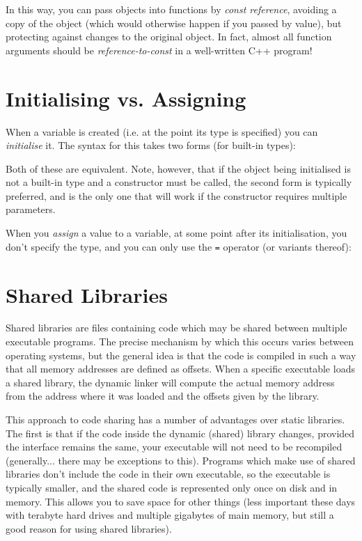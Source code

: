 \documentclass[a4paper]{scrartcl}
\begin{document}
In this way, you can pass objects into functions by \emph{const reference}, avoiding a copy of the object (which would otherwise happen if you passed by value), but protecting against changes to the original object. In fact, almost all function arguments should be \emph{reference-to-const} in a well-written C++ program!

\section{Initialising vs. Assigning}
When a variable is created (i.e. at the point its type is specified) you can \emph{initialise} it. The syntax for this takes two forms (for built-in types):



Both of these are equivalent. Note, however, that if the object being initialised is not a built-in type and a constructor must be called, the second form is typically preferred, and is the only one that will work if the constructor requires multiple parameters.

When you \emph{assign} a value to a variable, at some point after its initialisation, you don't specify the type, and you can only use the \verb|=| operator (or variants thereof):



\section{Shared Libraries}
Shared libraries are files containing code which may be shared between multiple executable programs. The precise mechanism by which this occurs varies between operating systems, but the general idea is that the code is compiled in such a way that all memory addresses are defined as offsets. When a specific executable loads a shared library, the dynamic linker will compute the actual memory address from the address where it was loaded and the offsets given by the library.

This approach to code sharing has a number of advantages over static libraries. The first is that if the code inside the dynamic (shared) library changes, provided the interface remains the same, your executable will not need to be recompiled (generally... there may be exceptions to this). Programs which make use of shared libraries don't include the code in their own executable, so the executable is typically smaller, and the shared code is represented only once on disk and in memory. This allows you to save space for other things (less important these days with terabyte hard drives and multiple gigabytes of main memory, but still a good reason for using shared libraries).
\end{document}
